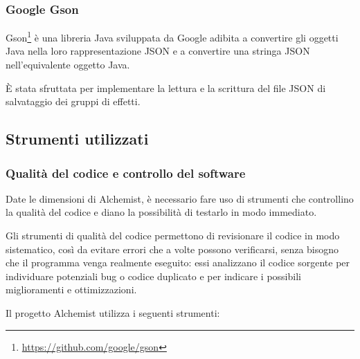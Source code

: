             \subsubsection{Google Gson}\label{subsubsec:gson}
                Gson\footnote{\url{https://github.com/google/gson}} è una libreria Java  sviluppata da Google adibita a convertire gli oggetti Java nella loro rappresentazione JSON e a convertire una stringa JSON nell'equivalente oggetto Java.

                È stata sfruttata per implementare la lettura e la scrittura del file JSON di salvataggio dei gruppi di effetti.

        \subsection{Strumenti utilizzati}\label{subsec:strum}
            \subsubsection{Qualità del codice e controllo del software}\label{subsubsec:codeQuality}
                Date le dimensioni di Alchemist, è necessario fare uso di strumenti che controllino la qualità del codice e diano la possibilità di testarlo in modo immediato.

                Gli strumenti di qualità del codice permettono di revisionare il codice in modo sistematico, così da evitare errori che a volte possono verificarsi, senza bisogno che il programma venga realmente eseguito:
                essi analizzano il codice sorgente per individuare potenziali bug o codice duplicato e per indicare i possibili miglioramenti e ottimizzazioni.

                Il progetto Alchemist utilizza i seguenti strumenti:

